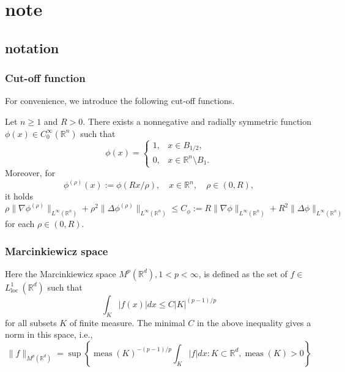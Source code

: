 
\chapter{note}

\section{notation}

\subsection{Cut-off function}

For convenience, we introduce the following cut-off functions.

\begin{lemma}
  \label{le: cut-off function}
  Let $n\geq1$ and $R>0$.
  There exists a nonnegative and radially symmetric function 
  $\phi(x)\in C_0^\infty(\mathbb R^n)$ such that 
  \begin{displaymath}
    \phi(x) = 
    \begin{cases}
      1, & x\in B_{1/2},\\
      0, & x\in\mathbb R^n\setminus B_1.
    \end{cases}
  \end{displaymath}
  Moreover, for
  \begin{displaymath}
    \phi^{(\rho)}(x) := \phi(Rx/\rho), \quad x\in \mathbb R^n,\quad  \rho\in(0,R),
  \end{displaymath}
  it holds 
  \begin{displaymath}
    \rho\|\nabla \phi^{(\rho)}\|_{L^\infty(\mathbb R^n)} 
    + \rho^2\|\Delta \phi^{(\rho)}\|_{L^\infty(\mathbb R^n)} 
    \leq C_\phi := 
    R\|\nabla \phi\|_{L^\infty(\mathbb R^n)} 
    + R^2\|\Delta \phi\|_{L^\infty(\mathbb R^n)}  
  \end{displaymath}
  for each $\rho\in(0,R)$.
\end{lemma}

\subsection{Marcinkiewicz space}

Here the Marcinkiewicz space $M^p\left(\mathbb{R}^d\right), 1<p<\infty$, is defined as the set of $f \in$ $L_{\text {loc }}^1(\mathbb{R}^d)$ such that
\[
\int_K|f(x)| d x \leq C|K|^{(p-1) / p}
\]
for all subsets $K$ of finite measure. The minimal $C$ in the above inequality gives a norm in this space, i.e.,
\[
\|f\|_{M^p\left(\mathbb{R}^d\right)}=\sup \left\{\operatorname{meas}(K)^{-(p-1) / p} \int_K|f| d x: K \subset \mathbb{R}^d, \operatorname{meas}(K)>0\right\}
\]

